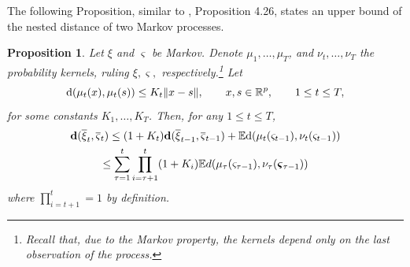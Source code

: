 \documentclass{article}              %
\newtheorem{proposition}{Proposition}
\begin{document}
\noindent The following Proposition, similar to \cite{pflug2014multistage},
Proposition 4.26, states an upper bound of the nested distance of
two Markov processes.
\begin{proposition}
\label{prop:pp} Let $\xi$ and $\varsigma$ be Markov. Denote $\mu_{1},\dots,\mu_{T}$,
and $\nu_{t},\dots,\nu_{T}$ the probability kernels, ruling $\xi,\varsigma,$
respectively.\footnote{Recall that, due to the Markov property, the kernels depend only on
the last observation of the process.} Let
\begin{equation}
\mathrm{d}(\mu_{t}(x),\mu_{t}(s))\leq K_{t}\|x-s\|,\qquad x,s\in\mathbb{R}^{p},\qquad1\leq t\leq T,\label{eq:ktl}
\end{equation}
for some constants $K_{1},\dots,K_{T}$. Then, for any $1\leq t\leq T$,
\begin{multline}
\mathbf{d}(\overline{\xi}_{t},\overline{\varsigma}_{t})\leq(1+K_{t})\mathbf{d}(\overline{\xi}_{t-1},\overline{\varsigma}_{t-1})+\mathbb{E}\mathrm{d}(\mu_{t}(\varsigma_{t-1}),\nu_{t}(\varsigma_{t-1}))\\
\leq\sum_{\tau=1}^{t}\prod_{i=\tau+1}^{t}(1+K_{i})\mathbb{E} d(\mu_{\tau}(\varsigma_{\text{\ensuremath{\tau}}-1}),\nu_{\tau}(\boldsymbol{\varsigma}_{\tau-1}))\label{eq:df}
\end{multline}
where $\prod_{i=t+1}^{t}=1$ by definition.
\end{proposition}
\end{document}
